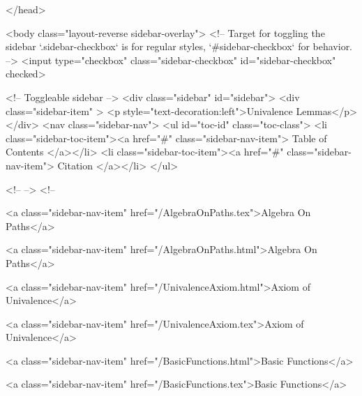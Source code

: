   
</head>




  <body class="layout-reverse sidebar-overlay">
    <!-- Target for toggling the sidebar `.sidebar-checkbox` is for regular
     styles, `#sidebar-checkbox` for behavior. -->
<input type="checkbox" class="sidebar-checkbox" id="sidebar-checkbox" checked>

<!-- Toggleable sidebar -->
<div class="sidebar" id="sidebar">
  <div class="sidebar-item" >
    <p style="text-decoration:left">Univalence Lemmas</p>
  </div>
  <nav class="sidebar-nav">
    <ul id="toc-id" class="toc-class">
  <li class="sidebar-toc-item"><a href="#" class="sidebar-nav-item"> Table of Contents </a></li>
  <li class="sidebar-toc-item"><a href="#" class="sidebar-nav-item"> Citation </a></li>
</ul>


    <!--  -->
    <!-- 
      
    
      
    
      
    
      
        
      
    
      
        
          <a class="sidebar-nav-item" href="/AlgebraOnPaths.tex">Algebra On Paths</a>
        
      
    
      
        
          <a class="sidebar-nav-item" href="/AlgebraOnPaths.html">Algebra On Paths</a>
        
      
    
      
        
          <a class="sidebar-nav-item" href="/UnivalenceAxiom.html">Axiom of Univalence</a>
        
      
    
      
        
          <a class="sidebar-nav-item" href="/UnivalenceAxiom.tex">Axiom of Univalence</a>
        
      
    
      
        
          <a class="sidebar-nav-item" href="/BasicFunctions.html">Basic Functions</a>
        
      
    
      
        
          <a class="sidebar-nav-item" href="/BasicFunctions.tex">Basic Functions</a>
        
      
    
